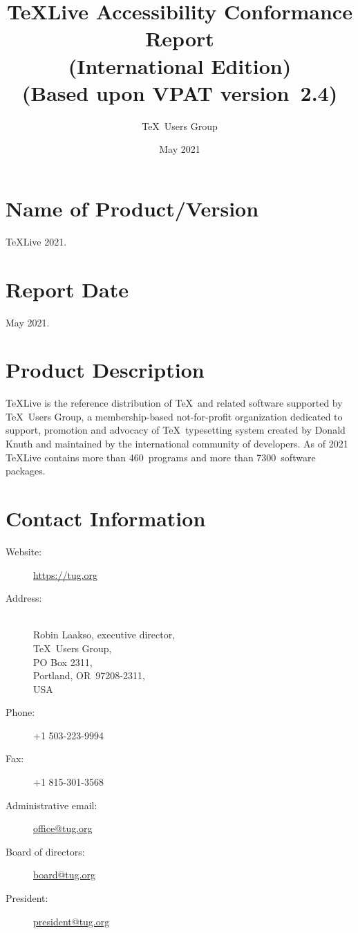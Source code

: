 \documentclass{report}
\begin{document}
\title{\TeX Live Accessibility Conformance Report\\
  (International Edition)\\
(Based upon VPAT\textsuperscript{\textregistered} version~2.4)}
\author{\TeX\ Users Group}
\date{May 2021}
\maketitle

\clearpage

\tableofcontents

\clearpage

\section{Name of Product/Version}
\label{sec:name}

\TeX Live 2021.


\section{Report Date}
\label{sec:date}

May 2021.


\section{Product Description}
\label{sec:description}

\TeX Live is the reference distribution of \TeX\ and related software
supported by \TeX\ Users Group, a membership-based not-for-profit
organization dedicated to support, promotion and advocacy of \TeX\
typesetting system created by Donald Knuth and maintained by the
international community of developers.  As of 2021 \TeX Live contains
more than 460~programs and more than 7300~software packages.

\section{Contact Information}
\label{sec:contact_info}

  \begin{description}
  \item[Website:]  \url{https://tug.org}
  \item[Address:] \leavevmode\\
    Robin Laakso, executive director,\\
    \TeX\ Users Group,\\
    PO Box 2311,\\
    Portland, OR~97208-2311,\\
    USA
  \item[Phone:] +1 503-223-9994
  \item[Fax:] +1 815-301-3568
  \item[Administrative email:] \href{mailto:office@tug.org}{office@tug.org}
  \item[Board of directors:] \href{mailto:board@tug.org}{board@tug.org}
  \item[President:] \href{mailto:president@tug.org}{president@tug.org}
  \end{description}
\end{document}

